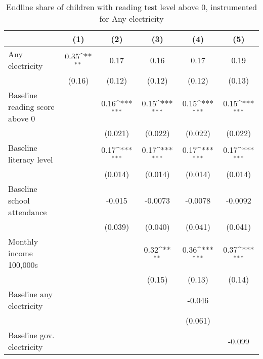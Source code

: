 \begin{table}[htbp]\centering
\def\sym#1{\ifmmode^{#1}\else\(^{#1}\)\fi}
\caption{Endline share of children with reading test level above 0, instrumented for Any electricity}
\begin{tabular*}{1\hsize}{@{\hskip\tabcolsep\extracolsep\fill}l*{5}{c}}
\toprule
                &\multicolumn{1}{c}{(1)}         &\multicolumn{1}{c}{(2)}         &\multicolumn{1}{c}{(3)}         &\multicolumn{1}{c}{(4)}         &\multicolumn{1}{c}{(5)}         \\
\midrule
Any electricity &     0.35\sym{**} &     0.17         &     0.16         &     0.17         &     0.19         \\
                &   (0.16)         &   (0.12)         &   (0.12)         &   (0.12)         &   (0.13)         \\
Baseline reading score above 0&                  &     0.16\sym{***}&     0.15\sym{***}&     0.15\sym{***}&     0.15\sym{***}\\
                &                  &  (0.021)         &  (0.022)         &  (0.022)         &  (0.022)         \\
Baseline literacy level&                  &     0.17\sym{***}&     0.17\sym{***}&     0.17\sym{***}&     0.17\sym{***}\\
                &                  &  (0.014)         &  (0.014)         &  (0.014)         &  (0.014)         \\
Baseline school attendance&                  &   -0.015         &  -0.0073         &  -0.0078         &  -0.0092         \\
                &                  &  (0.039)         &  (0.040)         &  (0.041)         &  (0.041)         \\
Monthly income 100,000s&                  &                  &     0.32\sym{**} &     0.36\sym{***}&     0.37\sym{***}\\
                &                  &                  &   (0.15)         &   (0.13)         &   (0.14)         \\
Baseline any electricity&                  &                  &                  &   -0.046         &                  \\
                &                  &                  &                  &  (0.061)         &                  \\
Baseline gov. electricity&                  &                  &                  &                  &   -0.099         \\

\end{tabular*}
\end{table}
